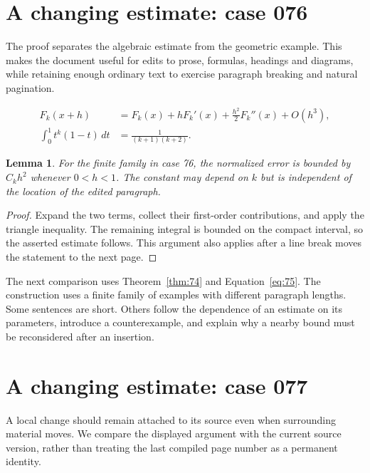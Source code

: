 \documentclass[a4paper,10pt]{article}
\newtheorem{lemma}[theorem]{Lemma}
\begin{document}
\lipsum[23]

\section{A changing estimate: case 076}\label{unit:75}
The proof separates the algebraic estimate from the geometric example. This makes the document useful for edits to prose, formulas, headings and diagrams, while retaining enough ordinary text to exercise paragraph breaking and natural pagination.

\lipsum[16-17]
\begin{align}\label{eq:75}
 F_k(x+h)&=F_k(x)+hF_k'(x)+\frac{h^2}{2}F_k''(x)+O(h^3),\\
 \int_0^1 t^k(1-t)\,dt&=\frac{1}{(k+1)(k+2)}.
\end{align}
\begin{lemma}\label{thm:75}
For the finite family in case 76, the normalized error is bounded by $C_k h^2$ whenever $0<h<1$. The constant may depend on $k$ but is independent of the location of the edited paragraph.
\end{lemma}
\begin{proof}
Expand the two terms, collect their first-order contributions, and apply the
triangle inequality. The remaining integral is bounded on the compact interval,
so the asserted estimate follows. This argument also applies after a line break
moves the statement to the next page.
\end{proof}
\begin{center}
\end{center}
The next comparison uses Theorem~\ref{thm:74} and Equation~\ref{eq:75}. The construction uses a finite family of examples with different paragraph lengths. Some sentences are short. Others follow the dependence of an estimate on its parameters, introduce a counterexample, and explain why a nearby bound must be reconsidered after an insertion.

\lipsum[3]

\section{A changing estimate: case 077}\label{unit:76}
A local change should remain attached to its source even when surrounding material moves. We compare the displayed argument with the current source version, rather than treating the last compiled page number as a permanent identity.
\end{document}
